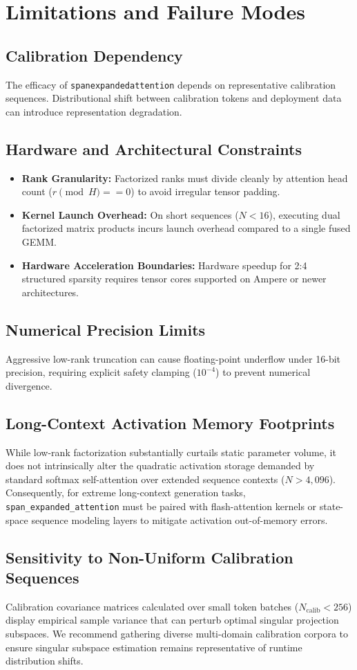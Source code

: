 \section{Limitations and Failure Modes}

\subsection{Calibration Dependency}
The efficacy of \texttt{spanexpandedattention} depends on representative calibration sequences. Distributional shift between calibration tokens and deployment data can introduce representation degradation.

\subsection{Hardware and Architectural Constraints}
\begin{itemize}
\item \textbf{Rank Granularity:} Factorized ranks must divide cleanly by attention head count ($r \pmod H == 0$) to avoid irregular tensor padding.
\item \textbf{Kernel Launch Overhead:} On short sequences ($N < 16$), executing dual factorized matrix products incurs launch overhead compared to a single fused GEMM.
\item \textbf{Hardware Acceleration Boundaries:} Hardware speedup for 2:4 structured sparsity requires tensor cores supported on Ampere or newer architectures.
\end{itemize}

\subsection{Numerical Precision Limits}
Aggressive low-rank truncation can cause floating-point underflow under 16-bit precision, requiring explicit safety clamping ($10^{-4}$) to prevent numerical divergence.

\subsection{Long-Context Activation Memory Footprints}
While low-rank factorization substantially curtails static parameter volume, it does not intrinsically alter the quadratic activation storage demanded by standard softmax self-attention over extended sequence contexts ($N > 4{,}096$). Consequently, for extreme long-context generation tasks, \texttt{span\_expanded\_attention} must be paired with flash-attention kernels or state-space sequence modeling layers to mitigate activation out-of-memory errors.

\subsection{Sensitivity to Non-Uniform Calibration Sequences}
Calibration covariance matrices calculated over small token batches ($N_{\text{calib}} < 256$) display empirical sample variance that can perturb optimal singular projection subspaces. We recommend gathering diverse multi-domain calibration corpora to ensure singular subspace estimation remains representative of runtime distribution shifts.
